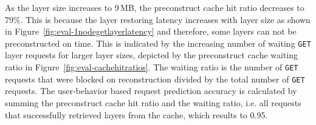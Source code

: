 As the layer size increases to 9\,MB, the preconstruct cache hit ratio decreases to 79\%.
%
This is because the layer restoring latency increases with layer size as shown in
Figure~\ref{fig:eval-1nodegetlayerlatency} and therefore, some layers can not be preconstructed
on time.
%
%
This is indicated by the increasing number of waiting \texttt{GET} layer requests for larger layer
sizes, depicted by the preconstruct cache waiting ratio in Figure~\ref{fig:eval-cachehitratios}.
%
The waiting ratio is the number of \texttt{GET} requests that were blocked on reconstruction
divided by the total number of \texttt{GET} requests.
%
%
%
The user-behavior based request prediction accuracy is calculated by summing the preconstruct
cache hit ratio and the waiting ratio, i.e. all requests that successfully retrieved layers from the cache,
which results to 0.95.
%


